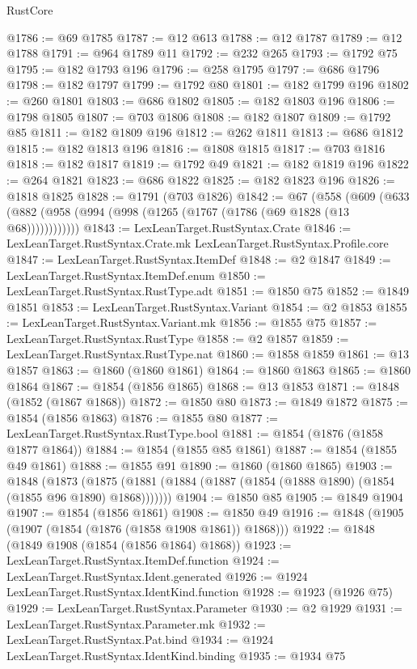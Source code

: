 \begin{lexlean}{RustCore}
\begin{coremodule}
@1786 := @69 @1785
@1787 := @12 @613
@1788 := @12 @1787
@1789 := @12 @1788
@1791 := @964 @1789 @11
@1792 := @232 @265
@1793 := @1792 @75
@1795 := @182 @1793 @196
@1796 := @258 @1795
@1797 := @686 @1796
@1798 := @182 @1797
@1799 := @1792 @80
@1801 := @182 @1799 @196
@1802 := @260 @1801
@1803 := @686 @1802
@1805 := @182 @1803 @196
@1806 := @1798 @1805
@1807 := @703 @1806
@1808 := @182 @1807
@1809 := @1792 @85
@1811 := @182 @1809 @196
@1812 := @262 @1811
@1813 := @686 @1812
@1815 := @182 @1813 @196
@1816 := @1808 @1815
@1817 := @703 @1816
@1818 := @182 @1817
@1819 := @1792 @49
@1821 := @182 @1819 @196
@1822 := @264 @1821
@1823 := @686 @1822
@1825 := @182 @1823 @196
@1826 := @1818 @1825
@1828 := @1791 (@703 @1826)
@1842 := @67
    (@558 (@609 (@633 (@882 (@958 (@994 (@998 (@1265 (@1767 (@1786 (@69 @1828 (@13 @68))))))))))))
@1843 := LexLeanTarget.RustSyntax.Crate
@1846 := LexLeanTarget.RustSyntax.Crate.mk LexLeanTarget.RustSyntax.Profile.core
@1847 := LexLeanTarget.RustSyntax.ItemDef
@1848 := @2 @1847
@1849 := LexLeanTarget.RustSyntax.ItemDef.enum
@1850 := LexLeanTarget.RustSyntax.RustType.adt
@1851 := @1850 @75
@1852 := @1849 @1851
@1853 := LexLeanTarget.RustSyntax.Variant
@1854 := @2 @1853
@1855 := LexLeanTarget.RustSyntax.Variant.mk
@1856 := @1855 @75
@1857 := LexLeanTarget.RustSyntax.RustType
@1858 := @2 @1857
@1859 := LexLeanTarget.RustSyntax.RustType.nat
@1860 := @1858 @1859
@1861 := @13 @1857
@1863 := @1860 (@1860 @1861)
@1864 := @1860 @1863
@1865 := @1860 @1864
@1867 := @1854 (@1856 @1865)
@1868 := @13 @1853
@1871 := @1848 (@1852 (@1867 @1868))
@1872 := @1850 @80
@1873 := @1849 @1872
@1875 := @1854 (@1856 @1863)
@1876 := @1855 @80
@1877 := LexLeanTarget.RustSyntax.RustType.bool
@1881 := @1854 (@1876 (@1858 @1877 @1864))
@1884 := @1854 (@1855 @85 @1861)
@1887 := @1854 (@1855 @49 @1861)
@1888 := @1855 @91
@1890 := @1860 (@1860 @1865)
@1903 := @1848
    (@1873 (@1875 (@1881 (@1884 (@1887 (@1854 (@1888 @1890) (@1854 (@1855 @96 @1890) @1868)))))))
@1904 := @1850 @85
@1905 := @1849 @1904
@1907 := @1854 (@1856 @1861)
@1908 := @1850 @49
@1916 := @1848 (@1905 (@1907 (@1854 (@1876 (@1858 @1908 @1861)) @1868)))
@1922 := @1848 (@1849 @1908 (@1854 (@1856 @1864) @1868))
@1923 := LexLeanTarget.RustSyntax.ItemDef.function
@1924 := LexLeanTarget.RustSyntax.Ident.generated
@1926 := @1924 LexLeanTarget.RustSyntax.IdentKind.function
@1928 := @1923 (@1926 @75)
@1929 := LexLeanTarget.RustSyntax.Parameter
@1930 := @2 @1929
@1931 := LexLeanTarget.RustSyntax.Parameter.mk
@1932 := LexLeanTarget.RustSyntax.Pat.bind
@1934 := @1924 LexLeanTarget.RustSyntax.IdentKind.binding
@1935 := @1934 @75

\end{coremodule}
\end{lexlean}

